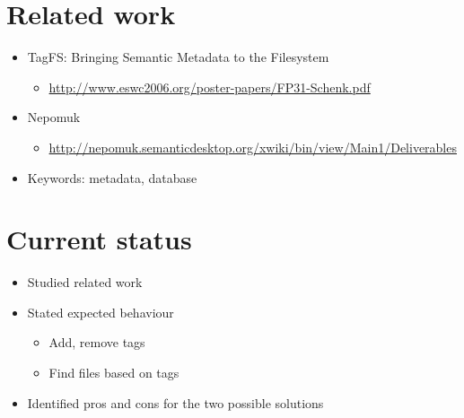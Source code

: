 \documentclass{beamer}
\begin{document}
\section{Related work}

\begin{frame}
  \begin{itemize}
  \item TagFS: Bringing Semantic Metadata to the Filesystem
    \begin{itemize}
    \item \url{http://www.eswc2006.org/poster-papers/FP31-Schenk.pdf}
    \end{itemize}
    
  \item Nepomuk
    \begin{itemize}
    \item \url{http://nepomuk.semanticdesktop.org/xwiki/bin/view/Main1/Deliverables}
    \end{itemize}
    
  \item Keywords: metadata, database
  \end{itemize}
  
\end{frame}

\section{Current status}

\begin{frame}
  \begin{itemize}
  \item Studied related work
  \item Stated expected behaviour
    \begin{itemize}
        \item Add, remove tags
        \item Find files based on tags
    \end{itemize}
  \item Identified pros and cons for the two possible solutions
  \end{itemize}
\end{frame}
\end{document}
